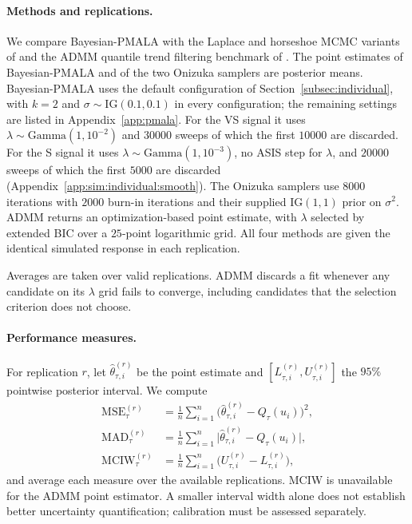 \paragraph{Methods and replications.} We compare Bayesian-PMALA with the Laplace and horseshoe MCMC variants of \citet{onizuka2024fast} and the ADMM quantile trend filtering benchmark of \citet{brantley2020baseline}. The point estimates of Bayesian-PMALA and of the two Onizuka samplers are posterior means. Bayesian-PMALA uses the default configuration of Section~\ref{subsec:individual}, with $k=2$ and $\sigma\sim\mathrm{IG}(0.1,0.1)$ in every configuration; the remaining settings are listed in Appendix~\ref{app:pmala}. For the VS signal it uses $\lambda\sim\mathrm{Gamma}(1,10^{-2})$ and $30000$ sweeps of which the first $10000$ are discarded. For the S signal it uses $\lambda\sim\mathrm{Gamma}(1,10^{-3})$, no ASIS step for $\lambda$, and $20000$ sweeps of which the first $5000$ are discarded (Appendix~\ref{app:sim:individual:smooth}). The Onizuka samplers use $8000$ iterations with $2000$ burn-in iterations and their supplied $\mathrm{IG}(1,1)$ prior on $\sigma^2$. ADMM returns an optimization-based point estimate, with $\lambda$ selected by extended BIC over a $25$-point logarithmic grid. All four methods are given the identical simulated response in each replication.

Averages are taken over valid replications. ADMM discards a fit whenever any candidate on its $\lambda$ grid fails to converge, including candidates that the selection criterion does not choose.

\paragraph{Performance measures.} For replication $r$, let $\widehat{\theta}_{\tau,i}^{(r)}$ be the point estimate and $[L_{\tau,i}^{(r)},U_{\tau,i}^{(r)}]$ the $95\%$ pointwise posterior interval. We compute
\begin{align*}
 \mathrm{MSE}^{(r)}_\tau&=\frac{1}{n}\sum_{i=1}^n
  \bigl(\widehat{\theta}_{\tau,i}^{(r)}-Q_\tau(u_i)\bigr)^2,\\
 \mathrm{MAD}^{(r)}_\tau&=\frac{1}{n}\sum_{i=1}^n
  \bigl|\widehat{\theta}_{\tau,i}^{(r)}-Q_\tau(u_i)\bigr|,\\
 \mathrm{MCIW}^{(r)}_\tau&=\frac{1}{n}\sum_{i=1}^n
  \bigl(U_{\tau,i}^{(r)}-L_{\tau,i}^{(r)}\bigr),
\end{align*}
and average each measure over the available replications. MCIW is unavailable for the ADMM point estimator. A smaller interval width alone does not establish better uncertainty quantification; calibration must be assessed separately.

